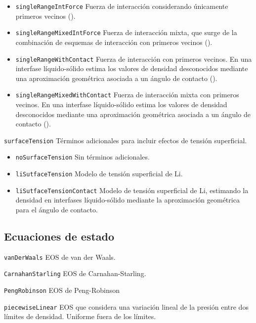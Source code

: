 \begin{itemize}
	\renewcommand{\labelitemi}{\:}
	\item \texttt{singleRangeIntForce}\: Fuerza de interacci\'on considerando \'unicamente primeros vecinos ().
	\item \texttt{singleRangeMixedIntForce}\: Fuerza de interacci\'on mixta, que surge de la combinaci\'on de esquemas de interacci\'on con primeros vecinos ().
	\item \texttt{singleRangeWithContact}\: Fuerza de interacci\'on con primeros vecinos. En una interfase l\'iquido-s\'olido estima los valores de densidad desconocidos mediante una aproximaci\'on geom\'etrica asociada a un \'angulo de contacto ().
	\item \texttt{singleRangeMixedWithContact}\: Fuerza de interacci\'on mixta con primeros vecinos. En una interfase l\'iquido-s\'olido estima los valores de densidad desconocidos mediante una aproximaci\'on geom\'etrica asociada a un \'angulo de contacto ().	
\end{itemize}
\medskip


\texttt{surfaceTension}\: T\'erminos adicionales para incluir efectos de tensi\'on superficial.

\begin{itemize}
	\renewcommand{\labelitemi}{\:}
	\item \texttt{noSurfaceTension}\: Sin t\'erminos adicionales.
	\item \texttt{liSutfaceTension}\: Modelo de tensi\'on superficial de Li.
	\item \texttt{liSutfaceTensionContact}\: Modelo de tensi\'on superficial de Li, estimando la densidad en interfases l\'iquido-s\'olido mediante la aproximaci\'on geom\'etrica para el \'angulo de contacto.
\end{itemize}



\subsection{Ecuaciones de estado}

\texttt{vanDerWaals}\: EOS de van der Waals.
\medskip

\texttt{CarnahanStarling}\: EOS de Carnahan-Starling.
\medskip

\texttt{PengRobinson}\: EOS de Peng-Robinson 
\medskip

\texttt{piecewiseLinear}\: EOS que considera una variaci\'on lineal de la presi\'on entre dos l\'imites de densidad. Uniforme fuera de los l\'imites.



